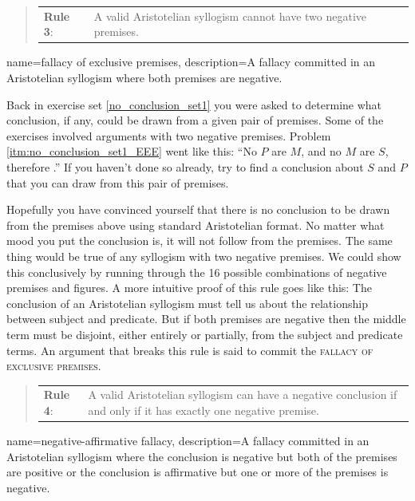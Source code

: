 \begin{quotation}
\begin{tabu}{p{.1\linewidth}p{.9\linewidth}}
\textbf{Rule 3}: & A valid Aristotelian syllogism cannot have two negative premises.
\end{tabu}\label{rule_3}
\end{quotation}

{
name=fallacy of exclusive premises,
description={A fallacy committed in an Aristotelian syllogism where both premises are negative.}
}

Back in exercise set \ref{no_conclusion_set1} you were asked to determine what conclusion, if any, could be drawn from a given pair of premises. Some of the exercises involved arguments with two negative premises. Problem \ref{itm:no_conclusion_set1_EEE} went like this: ``No $P$ are $M$, and no $M$ are $S$, therefore \underline{\hspace{2cm}}.'' If you haven't done so already, try to find a conclusion about $S$ and $P$ that you can draw from this pair of premises. 

Hopefully you have convinced yourself that there is no conclusion to be drawn  from the premises above using standard Aristotelian format. No matter what mood you put the conclusion is, it will not follow from the premises. The same thing would be true of any syllogism with two negative premises. We could show this conclusively by running through the 16 possible combinations of negative premises and figures. A more intuitive proof of this rule goes like this: The conclusion of an Aristotelian syllogism must tell us about the relationship between subject and predicate. But if both premises are negative then the middle term must be disjoint, either entirely or partially, from the subject and predicate terms. An argument that breaks this rule is said to commit the \textsc{\gls{fallacy of exclusive premises}}. \label{def:exclusive_premises}


\begin{quotation}
\begin{tabu}{p{.1\linewidth}p{.9\linewidth}}
\textbf{Rule 4}: & A valid Aristotelian syllogism can have a negative conclusion if and only if it has exactly one negative premise.
\end{tabu} \label{rule_4}
\end{quotation}
\label{rule4}

{
name=negative-affirmative  fallacy,
description={A fallacy committed in an Aristotelian syllogism where the conclusion is negative but both of the premises are positive or the conclusion is affirmative but one or more of the premises is negative.}
}

